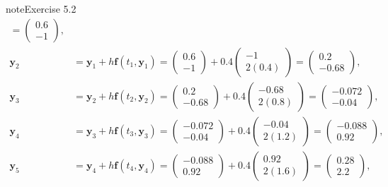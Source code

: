 \documentclass[letterpaper,10pt,english]{jupyterBook}
\begin{document}
\begin{sphinxadmonition}{note}{Exercise 5.2}
\begin{align*}
    = \begin{pmatrix} 0.6 \\ -1 \end{pmatrix}, \\
    \mathbf{y}_2 &= \mathbf{y}_1 + h \mathbf{f}(t_1, \mathbf{y}_1) 
    = \begin{pmatrix} 0.6 \\ -1 \end{pmatrix} + 0.4 \begin{pmatrix} -1 \\ 2(0.4) \end{pmatrix} 
    = \begin{pmatrix} 0.2 \\ -0.68 \end{pmatrix}, \\
    \mathbf{y}_3 &= \mathbf{y}_2 + h \mathbf{f}(t_2, \mathbf{y}_2) 
    = \begin{pmatrix} 0.2 \\ -0.68 \end{pmatrix} + 0.4 \begin{pmatrix} -0.68 \\ 2(0.8) \end{pmatrix} 
    = \begin{pmatrix} -0.072 \\ -0.04 \end{pmatrix}, \\
    \mathbf{y}_4 &= \mathbf{y}_3 + h \mathbf{f}(t_3, \mathbf{y}_3) 
    = \begin{pmatrix} -0.072 \\ -0.04 \end{pmatrix} + 0.4 \begin{pmatrix} -0.04 \\ 2(1.2) \end{pmatrix} 
    = \begin{pmatrix} -0.088 \\ 0.92 \end{pmatrix}, \\
    \mathbf{y}_5 &= \mathbf{y}_4 + h \mathbf{f}(t_4, \mathbf{y}_4) 
    = \begin{pmatrix} -0.088 \\ 0.92 \end{pmatrix} + 0.4 \begin{pmatrix} 0.92 \\ 2(1.6) \end{pmatrix} 
    = \begin{pmatrix} 0.28 \\ 2.2 \end{pmatrix}, \\
\end{align*}\end{sphinxadmonition}
\end{document}
